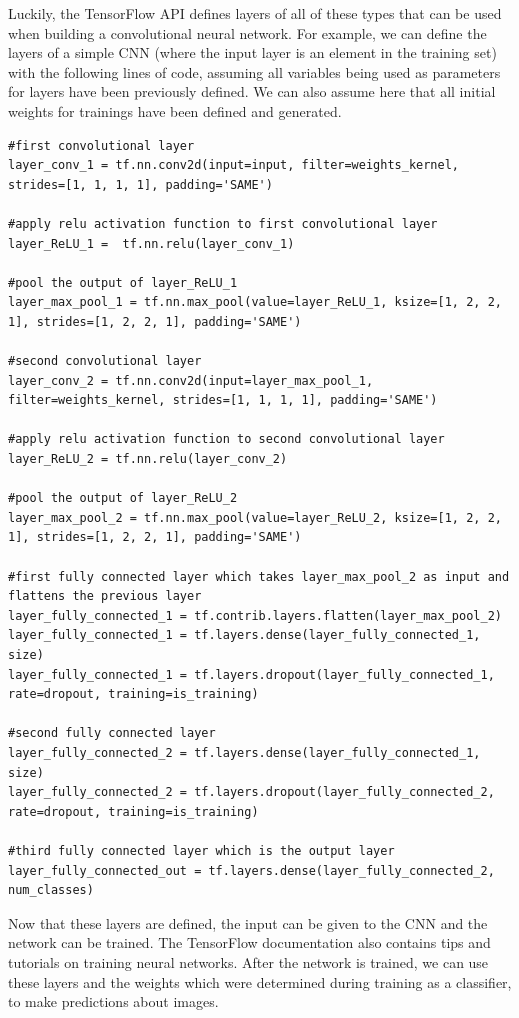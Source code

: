 \documentclass[12pt]{report} %
\begin{document}
	Luckily, the TensorFlow API defines layers of all of these types that can be used when building a convolutional neural network. For example, we can define the layers of a simple CNN (where the input layer is an element in the training set) with the following lines of code, assuming all variables being used as parameters for layers have been previously defined. We can also assume here that all initial weights for trainings have been defined and generated.
 \lstset{xleftmargin=10pt,xrightmargin=10pt}
\begin{lstlisting}
#first convolutional layer
layer_conv_1 = tf.nn.conv2d(input=input, filter=weights_kernel, strides=[1, 1, 1, 1], padding='SAME')

#apply relu activation function to first convolutional layer
layer_ReLU_1 =  tf.nn.relu(layer_conv_1)

#pool the output of layer_ReLU_1
layer_max_pool_1 = tf.nn.max_pool(value=layer_ReLU_1, ksize=[1, 2, 2, 1], strides=[1, 2, 2, 1], padding='SAME')

#second convolutional layer
layer_conv_2 = tf.nn.conv2d(input=layer_max_pool_1, filter=weights_kernel, strides=[1, 1, 1, 1], padding='SAME')

#apply relu activation function to second convolutional layer
layer_ReLU_2 = tf.nn.relu(layer_conv_2)

#pool the output of layer_ReLU_2
layer_max_pool_2 = tf.nn.max_pool(value=layer_ReLU_2, ksize=[1, 2, 2, 1], strides=[1, 2, 2, 1], padding='SAME')

#first fully connected layer which takes layer_max_pool_2 as input and flattens the previous layer
layer_fully_connected_1 = tf.contrib.layers.flatten(layer_max_pool_2)
layer_fully_connected_1 = tf.layers.dense(layer_fully_connected_1, size)
layer_fully_connected_1 = tf.layers.dropout(layer_fully_connected_1, rate=dropout, training=is_training)

#second fully connected layer
layer_fully_connected_2 = tf.layers.dense(layer_fully_connected_1, size)
layer_fully_connected_2 = tf.layers.dropout(layer_fully_connected_2, rate=dropout, training=is_training)

#third fully connected layer which is the output layer
layer_fully_connected_out = tf.layers.dense(layer_fully_connected_2, num_classes)
\end{lstlisting}

	Now that these layers are defined, the input can be given to the CNN and the network can be trained. The TensorFlow documentation also contains tips and tutorials on training neural networks\cite{tensorFlow}. After the network is trained, we can use these layers and the weights which were determined during training as a classifier, to make predictions about images.
	
\end{document}
